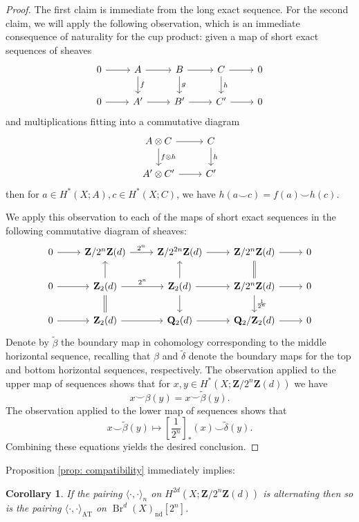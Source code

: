 \documentclass[10pt, reqno]{amsart}
\numberwithin{equation}{subsection}
\newcommand{\wt}[1]{\widetilde{#1}}
\newcommand{\Q}{\mathbf{Q}}
\newcommand{\Z}{\mathbf{Z}}
\newcommand{\mrm}[1]{\mathrm{#1}}
\DeclareMathOperator{\et}{\acute{e}t}
\DeclareMathOperator{\Br}{Br}
\DeclareMathOperator{\nd}{nd}
\newtheorem{cor}[thm]{Corollary}
\theoremstyle{remark}
\begin{document}
\begin{proof} The first claim is immediate from the long exact sequence. For the second claim, we will apply the following observation, which is an immediate consequence of naturality for the cup product: given a map of short exact sequences of sheaves
\[
\begin{tikzcd}
0 \ar[r] & A \ar[r] \ar[d, "f"] & B \ar[r] \ar[d, "g"] & C \ar[r] \ar[d, "h"] & 0 \\
0 \ar[r] & A' \ar[r] & B' \ar[r] & C' \ar[r] & 0
\end{tikzcd}
\]
and multiplications fitting into a commutative diagram 
\[
\begin{tikzcd}
A \otimes  C \ar[r] \ar[d, "f \otimes h" ]& C \ar[d, "h"]\\
A' \otimes C' \ar[r] & C'
\end{tikzcd}
\]
then for $a \in H^*(X;A), c \in  H^*(X;C)$, we have $h(a \smile c) = f(a) \smile h(c)$. 

We apply this observation to each of the maps of short exact sequences in the following commutative diagram of sheaves:
\[
\begin{tikzcd}
0 \ar[r] & \Z/2^n\Z(d) \ar[r, "2^n"] & \Z/2^{2n} \Z(d) \ar[r] & \Z/2^n\Z(d) \ar[r] & 0 \\
0 \ar[r] & \Z_2 (d)\ar[u] \ar[r, "2^n"] \ar[d, equals] & \Z_2 (d)\ar[u]  \ar[r] \ar[d] & \Z/2^n\Z(d)  \ar[u, equals] \ar[r] \ar[d, "\frac{1}{2^n}"]& 0 \\
0 \ar[r] & \Z_2(d)\ar[r] & \Q_2 (d) \ar[r] & \Q_2/\Z_2 (d)\ar[r] & 0
\end{tikzcd}
\]
Denote by $\wt{\beta}$ the boundary map in cohomology corresponding to the middle horizontal sequence, recalling that $\beta$ and $\wt{\delta}$ denote the boundary maps for the top and bottom horizontal sequences, respectively. The observation applied to the upper map of sequences shows that for $x, y \in H^*_{\et}(X; \Z/2^n\Z(d))$ we have 
\[
x \smile \beta (y) = x \smile \wt{\beta}(y).
\]
The observation applied to the lower map of sequences shows that 
\[
x \smile  \wt{\beta}(y) \mapsto [\frac{1}{2^n}]_*(x) \smile \wt{\delta}(y). 
\]
Combining these equations yields the desired conclusion. 
\end{proof}

Proposition \ref{prop: compatibility} immediately implies: 

\begin{cor}\label{cor: alternating_criterion}
If the pairing $\langle \cdot , \cdot \rangle_n$ on $H_{\et}^{2d}(X; \Z/2^n\Z(d))$ is alternating then so is the pairing $\langle \cdot, \cdot \rangle_{\mrm{AT}}$ on $\Br^d(X)_{\nd}[2^n]$. 
\end{cor}
\end{document}
